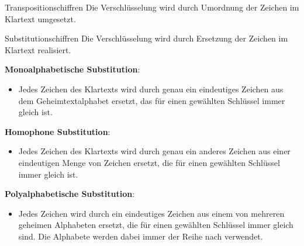 \documentclass[german]{../spicker}
\begin{document}
\begin{defi}{Transpositionschiffren}
    Die Verschlüsselung wird durch Umordnung der Zeichen
    im Klartext umgesetzt.
\end{defi}

\begin{defi}{Substitutionschiffren}
    Die Verschlüsselung wird durch Ersetzung der Zeichen
    im Klartext realisiert.

    \textbf{Monoalphabetische Substitution}:
    \begin{itemize}
        \item Jedes Zeichen des Klartexts wird durch genau
              ein eindeutiges Zeichen aus dem Geheimtextalphabet ersetzt, das für einen
              gewählten Schlüssel immer gleich ist.
    \end{itemize}

    \textbf{Homophone Substitution}:
    \begin{itemize}
        \item Jedes Zeichen des Klartexts wird durch genau ein
              anderes Zeichen aus einer eindeutigen Menge von Zeichen ersetzt, die für einen
              gewählten Schlüssel immer gleich ist.
    \end{itemize}

    \textbf{Polyalphabetische Substitution}:
    \begin{itemize}
        \item Jedes Zeichen wird durch ein eindeutiges Zeichen
              aus einem von mehreren geheimen Alphabeten ersetzt, die für einen gewählten
              Schlüssel immer gleich sind. Die Alphabete werden dabei immer der Reihe nach
              verwendet.
    \end{itemize}
\end{defi}
\end{document}
